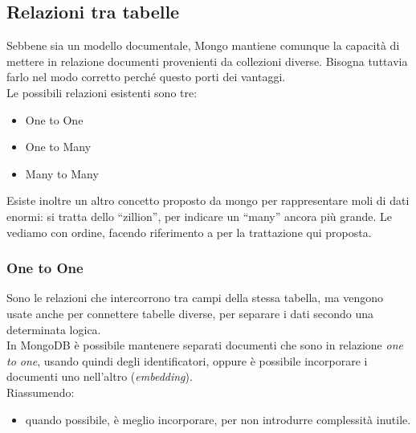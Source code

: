 \subsection{Relazioni tra tabelle}
Sebbene sia un modello documentale, Mongo mantiene comunque la capacità di mettere in relazione documenti provenienti da collezioni diverse. Bisogna tuttavia farlo nel modo corretto perché questo porti dei vantaggi.\\

\noindent Le possibili relazioni esistenti sono tre:
\begin{itemize}
    \item One to One
    \item One to Many
    \item Many to Many
\end{itemize}
Esiste inoltre un altro concetto proposto da mongo per rappresentare moli di dati enormi: si tratta dello ``zillion'', per indicare un ``many'' ancora più grande. Le vediamo con ordine, facendo riferimento a \cite{site:mongoDataModeling} per la trattazione qui proposta.

\subsubsection{One to One}
Sono le relazioni che intercorrono tra campi della stessa tabella, ma vengono usate anche per connettere tabelle diverse, per separare i dati secondo una determinata logica.\\
In MongoDB è possibile mantenere separati documenti che sono in relazione \textit{one to one}, usando quindi degli identificatori, oppure è possibile incorporare i documenti uno nell'altro (\textit{embedding}).\\
Riassumendo:
\begin{itemize}
    \item quando possibile, è meglio incorporare, per non introdurre complessità inutile.
\end{itemize}

